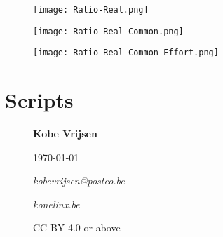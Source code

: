 \documentclass[11pt,a4paper]{report}
\begin{document}
\begin{figure}[ht!]
\centering
\texttt{[image: Ratio-Real.png]}
\end{figure}

\begin{figure}[ht!]
\centering
\texttt{[image: Ratio-Real-Common.png]}
\end{figure}

\begin{figure}[ht!]
\centering
\texttt{[image: Ratio-Real-Common-Effort.png]}
\end{figure}

\chapter{Scripts\label{app:script}}

\lstset{style=cmdstyle}


\newpage
{}

\begin{figure}
    \centering
\begin{center}
\item \textbf{Kobe Vrijsen}
\item \today
\item 
\item \textit{kobevrijsen@posteo.be}
\item \textit{konelinx.be}
\item 
\item CC BY 4.0 or above
\end{center}

\end{figure}
\end{document}
